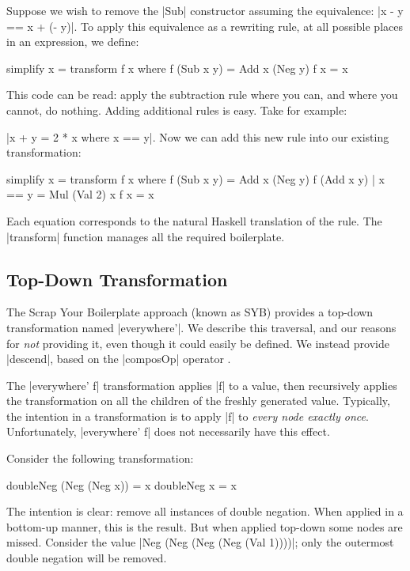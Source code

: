 \begin{example}
\label{ex:simplify}
Suppose we wish to remove the |Sub| constructor assuming the equivalence: |x - y == x + (- y)|. To apply this equivalence as a rewriting rule, at all possible places in an expression, we define:

\begin{code}
simplify x = transform f x
    where  f (Sub x y)  = Add x (Neg y)
           f x          = x
\end{code}

This code can be read: apply the subtraction rule where you can, and where you cannot, do nothing. Adding additional rules is easy. Take for example: \ignore|x + y = 2 * x where x == y|. Now we can add this new rule into our existing transformation:

\begin{code}
simplify x = transform f x
    where  f (Sub x y)           = Add x (Neg y)
           f (Add x y) | x == y  = Mul (Val 2) x
           f x                   = x
\end{code}

Each equation corresponds to the natural Haskell translation of the rule. The |transform| function manages all the required boilerplate.
\end{example}

\subsection{Top-Down Transformation}

The Scrap Your Boilerplate approach \cite{lammel:syb} (known as SYB) provides a top-down transformation named |everywhere'|. We describe this traversal, and our reasons for \textit{not} providing it, even though it could easily be defined. We instead provide |descend|, based on the |composOp| operator \cite{bringert:compos}.

The |everywhere' f| transformation applies |f| to a value, then recursively applies the transformation on all the children of the freshly generated value. Typically, the intention in a transformation is to apply |f| to \textit{every node exactly once}. Unfortunately, |everywhere' f| does not necessarily have this effect.

\begin{example}
Consider the following transformation:

\begin{code}
doubleNeg (Neg (Neg x))  = x
doubleNeg x              = x
\end{code}

The intention is clear: remove all instances of double negation. When applied in a bottom-up manner, this is the result. But when applied top-down some nodes are missed. Consider the value |Neg (Neg (Neg (Neg (Val 1))))|; only the outermost double negation will be removed.
\end{example}

